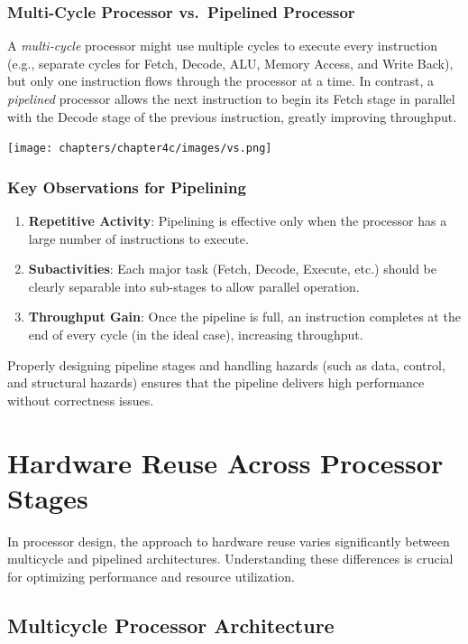 \subsubsection*{Multi-Cycle Processor vs.\ Pipelined Processor}
A \emph{multi-cycle} processor might use multiple cycles to execute every instruction (e.g., separate cycles for Fetch, Decode, ALU, Memory Access, and Write Back), but only one instruction flows through the processor at a time. In contrast, a \emph{pipelined} processor allows the next instruction to begin its Fetch stage in parallel with the Decode stage of the previous instruction, greatly improving throughput.
\begin{center}
    \texttt{[image: chapters/chapter4c/images/vs.png]}
\end{center}
\subsubsection*{Key Observations for Pipelining}
\begin{enumerate}
    \item \textbf{Repetitive Activity}: Pipelining is effective only when the processor has a large number of instructions to execute.
    \item \textbf{Subactivities}: Each major task (Fetch, Decode, Execute, etc.) should be clearly separable into sub-stages to allow parallel operation.
    \item \textbf{Throughput Gain}: Once the pipeline is full, an instruction completes at the end of every cycle (in the ideal case), increasing throughput.
\end{enumerate}

\noindent Properly designing pipeline stages and handling hazards (such as data, control, and structural hazards) ensures that the pipeline delivers high performance without correctness issues.

\section{Hardware Reuse Across Processor Stages}

In processor design, the approach to hardware reuse varies significantly between multicycle and pipelined architectures. Understanding these differences is crucial for optimizing performance and resource utilization.

\subsection{Multicycle Processor Architecture}

